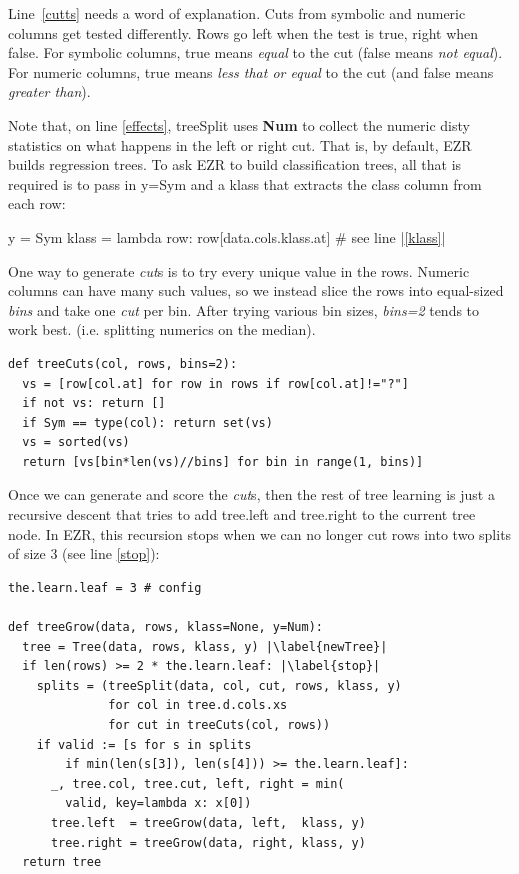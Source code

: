 \documentclass[AMA,STIX2COL]{WileyNJDv5}
\newcommand{\cls}[1]{%
  \setlength{\fboxsep}{1.5pt}%
  \colorbox{clsbg}{\sffamily\bfseries{#1}}%
}
\begin{document}
Line~\ref{cutts} needs a word of explanation.
Cuts from symbolic and numeric columns get tested differently. Rows go left when the test is true, right when false. For symbolic columns, true means {\em equal} to the cut (false means 
{\em not equal}). For numeric columns, true means {\em less that or equal} to  the cut (and false means {\em greater than}).

Note that, on  line \ref{effects}, \textsf{treeSplit}   uses \cls{Num} to  
collect the numeric  \textsf{disty} statistics on what happens in the left or right cut. That is, by default, EZR builds regression trees.
To ask EZR to build classification
trees, all that is required is to pass in \textsf{y=Sym} and
a \textsf{klass} that extracts the class column from each row:
\begin{repl}
y = Sym
klass = lambda row: row[data.cols.klass.at] # see line |\ref{klass}|
\end{repl}
One way to generate {\em cut}s is to try every unique value in the rows. Numeric columns can have many such values, so we instead slice the rows into equal-sized 
{\em bins} and take one 
{\em cut} per bin. After trying  various bin sizes,
 {\em bins=2} tends to work best.
(i.e. splitting numerics on the median).
\begin{lstlisting}
def treeCuts(col, rows, bins=2):
  vs = [row[col.at] for row in rows if row[col.at]!="?"]
  if not vs: return []
  if Sym == type(col): return set(vs)
  vs = sorted(vs)
  return [vs[bin*len(vs)//bins] for bin in range(1, bins)]
\end{lstlisting}
Once we can generate and score the {\em cut}s, then the rest of tree learning is just
a recursive descent that tries to add \textsf{tree.left} and \textsf{tree.right} to the
current \textsf{tree} node.  In EZR, this recursion stops when
we can no longer cut rows into two splits of size 3 (see line \ref{stop}):
\begin{lstlisting}
the.learn.leaf = 3 # config

def treeGrow(data, rows, klass=None, y=Num):
  tree = Tree(data, rows, klass, y) |\label{newTree}|
  if len(rows) >= 2 * the.learn.leaf: |\label{stop}|
    splits = (treeSplit(data, col, cut, rows, klass, y)
              for col in tree.d.cols.xs
              for cut in treeCuts(col, rows))
    if valid := [s for s in splits
        if min(len(s[3]), len(s[4])) >= the.learn.leaf]:
      _, tree.col, tree.cut, left, right = min(
        valid, key=lambda x: x[0])
      tree.left  = treeGrow(data, left,  klass, y)
      tree.right = treeGrow(data, right, klass, y)
  return tree
\end{lstlisting}
\end{document}
